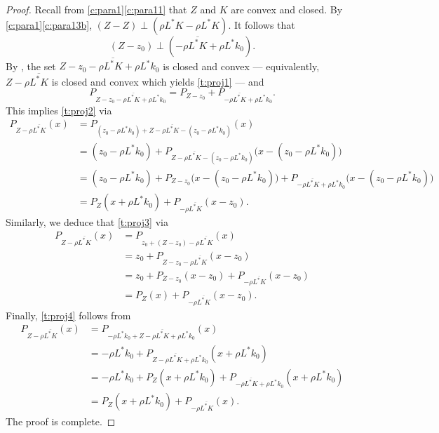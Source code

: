 \documentclass{article}
\newcommand{\cl}[1]{\overline{#1}}
\begin{document}
\begin{proof}
Recall from \cref{c:para1}\cref{c:para11} that
$Z$ and $K$ are convex and closed. 
By \cref{c:para1}\cref{c:para13b}, 
$(Z-Z)\perp (\rho L^*K-\rho L^*K)$. 
It follows that 
\begin{equation}
(Z-z_0)\perp (-\rho \overline{L^*K}+\rho L^*k_0).
\end{equation}
By \cite[Proposition~29.6]{BC2017}, the set 
$Z-z_0-\rho\overline{L^*K}+\rho L^*k_0$ is closed and convex 
--- equivalently, $Z-\rho \overline{L^*K}$ is closed and convex 
which yields \cref{t:proj1} ---
and 
  \begin{equation}
    P_{Z-z_0-\rho \overline{L^*K}+\rho L^*k_0}
    =P_{Z-z_0}+P_{-\rho \cl{L^*K}+\rho L^*k_0}.
\end{equation}
This implies \cref{t:proj2} via 
\begin{subequations}
\begin{align}
P_{Z-\rho \cl{L^*K}}(x)
&=P_{(z_0-\rho L^*k_0)+Z-\rho \cl{L^*K}-(z_0-\rho L^*k_0)}(x)\\
&=(z_0-\rho L^*k_0)+P_{Z-\rho \cl{L^*K}-(z_0-\rho L^*k_0)}\big(x-(z_0-\rho L^*k_0)\big)\\
&=(z_0-\rho L^*k_0)+P_{Z-z_0}\big(x-(z_0-\rho L^*k_0)\big)
+P_{-\rho \cl{L^*K}+\rho L^*k_0}\big(x-(z_0-\rho L^*k_0)\big)\\
&=P_{Z}(x+\rho L^*k_0)+P_{-\rho \cl{L^*K}}(x-z_0).
\end{align}
\end{subequations}
Similarly, we deduce that \cref{t:proj3} via 
\begin{subequations}
\begin{align}
P_{Z-\rho \cl{L^*K}}(x)
&=  P_{z_0+(Z-z_0)-\rho \cl{L^*K}}(x)\\
&=z_0+P_{Z-z_0-\rho \cl{L^*K}}(x-z_0)\\
&=z_0+P_{Z-z_0}(x-z_0)+P_{-\rho \cl{L^*K}}(x-z_0)\\
&=P_{Z}(x)+P_{-\rho \cl{L^*K}}(x-z_0). 
\end{align}
\end{subequations}
Finally, \cref{t:proj4} follows from
\begin{subequations}
\begin{align}
P_{Z-\rho \cl{L^*K}}(x)
&=P_{-\rho L^*k_0+Z-\rho \cl{L^*K}+\rho L^*k_0}(x)\\
&=-\rho L^*k_0+P_{Z-\rho \cl{L^*K}+\rho L^*k_0}(x+\rho L^*k_0)\\
&=-\rho L^*k_0
   +P_{Z}(x+\rho L^*k_0)+P_{-\rho \cl{L^*K}+\rho L^*k_0}(x+\rho L^*k_0)\\
&=P_{Z}(x+\rho L^*k_0)+P_{-\rho \cl{L^*K}}(x).
\end{align}
\end{subequations}
The proof is complete. 
\end{proof}
\end{document}

